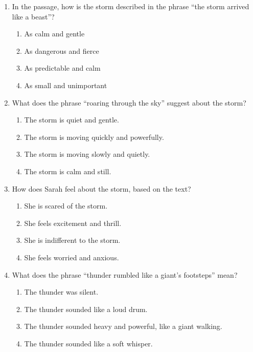 \documentclass[12pt]{article}
\begin{document}
\begin{enumerate}

\item In the passage, how is the storm described in the phrase “the storm arrived like a beast”?

\begin{enumerate}[label=\Alph*.]
    \item As calm and gentle
    \item As dangerous and fierce
    \item As predictable and calm
    \item As small and unimportant
\end{enumerate}

\vspace{0.5cm}

\item What does the phrase “roaring through the sky” suggest about the storm?

\begin{enumerate}[label=\Alph*.]
    \item The storm is quiet and gentle.
    \item The storm is moving quickly and powerfully.
    \item The storm is moving slowly and quietly.
    \item The storm is calm and still.
\end{enumerate}

\vspace{0.5cm}

\item How does Sarah feel about the storm, based on the text?

\begin{enumerate}[label=\Alph*.]
    \item She is scared of the storm.
    \item She feels excitement and thrill.
    \item She is indifferent to the storm.
    \item She feels worried and anxious.
\end{enumerate}

\vspace{0.5cm}

\item What does the phrase “thunder rumbled like a giant’s footsteps” mean?

\begin{enumerate}[label=\Alph*.]
    \item The thunder was silent.
    \item The thunder sounded like a loud drum.
    \item The thunder sounded heavy and powerful, like a giant walking.
    \item The thunder sounded like a soft whisper.
\end{enumerate}


\end{enumerate}
\end{document}
